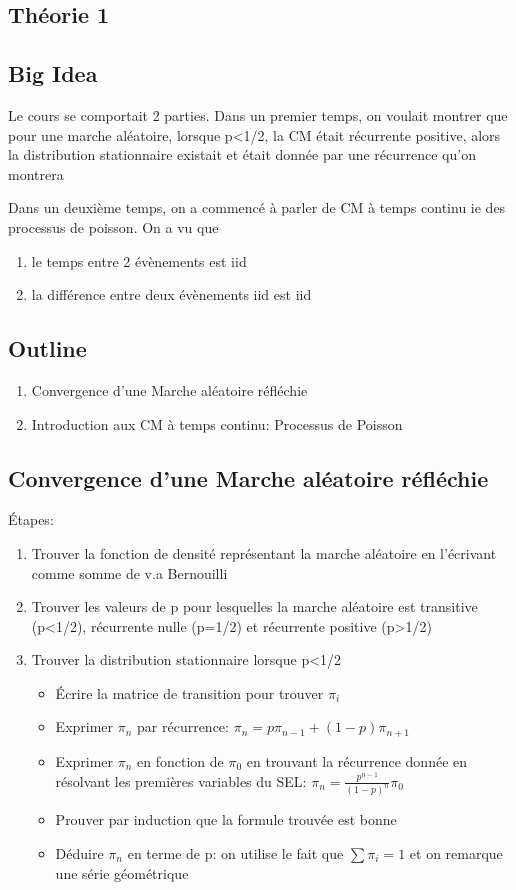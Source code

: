 \documentclass{article}
\begin{document}
\subsection{Théorie 1}
\subsection*{Big Idea}

Le cours se comportait 2 parties. Dans un premier temps, on voulait montrer que pour une marche aléatoire, lorsque p<1/2, la CM était récurrente
positive, alors la distribution stationnaire existait et était donnée
par une récurrence qu'on montrera

Dans un deuxième temps, on a commencé à parler de CM à temps continu
ie des processus de poisson. On a vu que
\begin{enumerate}
    \item le temps entre 2 évènements est iid
    \item la différence entre deux évènements iid est iid
\end{enumerate}

\subsection*{Outline}
\begin{enumerate}
    \item Convergence d'une Marche aléatoire réfléchie
    \item Introduction aux CM à temps continu: Processus de Poisson
\end{enumerate}

\subsection{Convergence d'une Marche aléatoire réfléchie}

Étapes:
\begin{enumerate}
    \item Trouver la fonction de densité représentant la marche
	aléatoire en l'écrivant comme somme de v.a Bernouilli
    \item Trouver les valeurs de p pour lesquelles la marche aléatoire
	est transitive (p<1/2), récurrente nulle (p=1/2) et récurrente
	positive (p>1/2)
    \item Trouver la distribution stationnaire lorsque p<1/2
	\begin{itemize}
	    \item Écrire la matrice de transition pour trouver $\pi _i$
	    \item Exprimer $\pi _n$ par récurrence:
		$\pi _n = p \pi _{n-1} +(1-p) \pi _{n+1}$
	    \item Exprimer $\pi _n$ en fonction de $\pi _0$ en trouvant
		la récurrence donnée en résolvant les premières variables
		du SEL: $ \pi _n = \frac{p^{n-1}}{(1-p)^n} \pi _0$
	    \item Prouver par induction que la formule trouvée est bonne
	    \item Déduire $\pi _n$ en terme de p: on utilise le fait
		que $\sum \pi _i =1$ et on remarque une série géométrique
	\end{itemize}
\end{enumerate}
\end{document}
